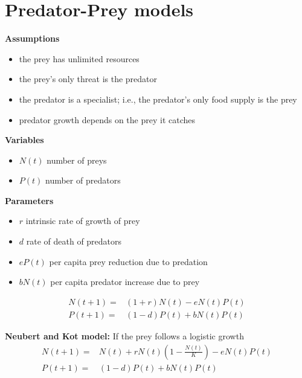\section{Predator-Prey models}
{\bf Assumptions}
\begin{itemize}
\item the prey has unlimited resources
\item the prey's only threat is the predator
\item the predator is a specialist; i.e., the predator's only food supply is the prey
\item predator growth depends on the prey it catches
\end{itemize}
{\bf Variables}
\begin{itemize}
\item $N(t)$ number of preys
\item $P(t)$ number of predators
\end{itemize}
{\bf Parameters}
\begin{itemize}
\item $r$ intrinsic rate of growth of prey
\item $d$ rate of death of predators
\item $eP(t)$ per capita prey reduction due to predation
\item $bN(t)$ per capita predator increase due to prey
\end{itemize}
\begin{equation*}
\begin{array}{cl}
N(t+1)=&(1+r)N(t)-e N(t)P(t)\\
P(t+1)=&(1-d)P(t)+bN(t)P(t)
\end{array}
\end{equation*}

{\bf Neubert and Kot model:}
If the prey follows a logistic growth
\begin{equation*}
\begin{array}{cl}
N(t+1)=&N(t)+rN(t)\left ( 1-\frac{N(t)}{K} \right ) -e N(t)P(t)\\
P(t+1)=&(1-d)P(t)+bN(t)P(t)
\end{array}
\end{equation*}




